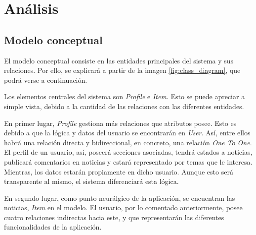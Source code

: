 
\chapter{Análisis}\label{analisis}
\section{Modelo conceptual}\label{sec:modelo_conceptual}

El modelo conceptual consiste en las entidades principales del sistema y sus relaciones. Por ello, se explicará a partir de la imagen \ref{fig:class_diagram}, que podrá verse a continuación.


Los elementos centrales del sistema son \textit{Profile} e \textit{Item}. Esto se puede apreciar a simple vista, debido a la cantidad de las relaciones con las diferentes entidades.

En primer lugar, \textit{Profile} gestiona más relaciones que atributos posee. Esto es debido a que la lógica y datos del usuario se encontrarán en \textit{User}. Así, entre ellos habrá una relación directa y bidireccional, en concreto, una relación \textit{One To One}. El perfil de un usuario, así, poseerá secciones asociadas, tendrá estados a noticias, publicará comentarios en noticias y estará representado por temas que le interesa. Mientras, los datos estarán propiamente en dicho usuario. Aunque esto será transparente al mismo, el sistema diferenciará esta lógica.

En segundo lugar, como punto neurálgico de la aplicación, se encuentran las noticias, \textit{Item} en el modelo. El usuario, por lo comentado anteriormente, posee cuatro relaciones indirectas hacia este, y que representarán las diferentes funcionalidades de la aplicación.

